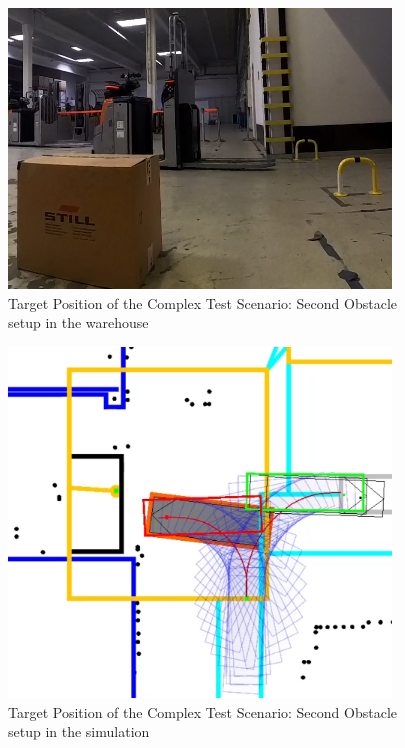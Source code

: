 \begin{figure}[H]
    \begin{center}
        \includegraphics[width=4in]{images/Chap3/Test3/Target_Real.png} %
        \caption{Target Position of the Complex Test Scenario: Second Obstacle setup in the warehouse}
        \label{OptResult22}
        \end{center}    
\end{figure}

\begin{figure}[H]
    \begin{center}
        \includegraphics[width=4in]{images/Chap3/Test3/Target_simu.png} %
        \caption{Target Position of the Complex Test Scenario: Second Obstacle setup in the simulation}
        \label{OptResult23}
        \end{center}    
\end{figure}



